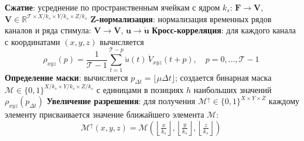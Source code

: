 \begin{algorithm}[h!]
    \caption{Отбор информативных каналов по кросс-корреляции со стимулом}\label{alg:bad}
    \nl \textbf{Сжатие}: усреднение по пространственным ячейкам с ядром $k_s$:
    $\mathbf{F} \rightarrow \mathbf{V}$, $\mathbf{V} \in \mathbb{R}^{\mathcal{T} \times X/k_s \times Y/k_s \times Z/k_s}$\;
    \nl \textbf{Z-нормализация}: нормализация временных рядов каналов и ряда стимула:
    $\mathbf{V} \rightarrow \mathring{\mathbf{V}}$, $\mathbf{u} \rightarrow \mathring{\mathbf{u}}$\;
    \nl \textbf{Кросс-корреляция}: для каждого канала с координатами $(x, y, z)$ вычисляется
    \[
    \rho_{xyz}(p) = \frac{1}{\mathcal{T}-1} \sum_{t=1}^{\mathcal{T}-p} \mathring{u}(t)\, \mathring{V}_{xyz}(t+p), \quad p = 0, \ldots, \mathcal{T}-1\;
    \]
    \nl \textbf{Определение маски}: вычисляется $p_{\Delta t} = \lfloor \mu \Delta t \rfloor$; создается бинарная маска $\mathcal{M} \in \{0,1\}^{X/k_s \times Y/k_s \times Z/k_s}$ с единицами в позициях $h$ наибольших значений $\rho_{xyz}(p_{\Delta t})$\;
    \nl \textbf{Увеличение разрешения}: для получения $\mathcal{M}^{\uparrow} \in \{0,1\}^{X \times Y \times Z}$ каждому элементу присваивается значение ближайшего элемента $\mathcal{M}$:
    \[
    \mathcal{M}^{\uparrow}(x, y, z) = \mathcal{M}\left(\left\lfloor \tfrac{x}{k_s} \right\rfloor, \left\lfloor \tfrac{y}{k_s} \right\rfloor, \left\lfloor \tfrac{z}{k_s} \right\rfloor\right)\;
    \]
\end{algorithm}

